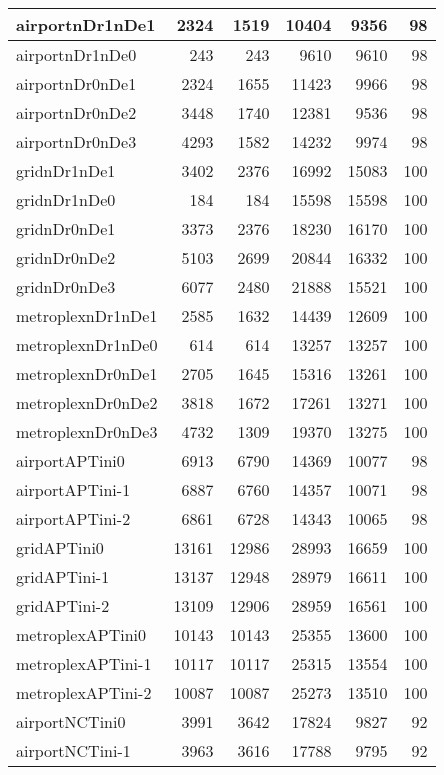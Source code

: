 \begin{longtable}{|l|r|r|r|r|r|}
\endlastfoot
airportnDr1nDe1 & 2324 & 1519 & 10404 & 9356 & 98 \\ \hline
airportnDr1nDe0 & 243 & 243 & 9610 & 9610 & 98 \\ \hline
airportnDr0nDe1 & 2324 & 1655 & 11423 & 9966 & 98 \\ \hline
airportnDr0nDe2 & 3448 & 1740 & 12381 & 9536 & 98 \\ \hline
airportnDr0nDe3 & 4293 & 1582 & 14232 & 9974 & 98 \\ \hline
gridnDr1nDe1 & 3402 & 2376 & 16992 & 15083 & 100 \\ \hline
gridnDr1nDe0 & 184 & 184 & 15598 & 15598 & 100 \\ \hline
gridnDr0nDe1 & 3373 & 2376 & 18230 & 16170 & 100 \\ \hline
gridnDr0nDe2 & 5103 & 2699 & 20844 & 16332 & 100 \\ \hline
gridnDr0nDe3 & 6077 & 2480 & 21888 & 15521 & 100 \\ \hline
metroplexnDr1nDe1 & 2585 & 1632 & 14439 & 12609 & 100 \\ \hline
metroplexnDr1nDe0 & 614 & 614 & 13257 & 13257 & 100 \\ \hline
metroplexnDr0nDe1 & 2705 & 1645 & 15316 & 13261 & 100 \\ \hline
metroplexnDr0nDe2 & 3818 & 1672 & 17261 & 13271 & 100 \\ \hline
metroplexnDr0nDe3 & 4732 & 1309 & 19370 & 13275 & 100 \\ \hline
airportAPTini0 & 6913 & 6790 & 14369 & 10077 & 98 \\ \hline
airportAPTini-1 & 6887 & 6760 & 14357 & 10071 & 98 \\ \hline
airportAPTini-2 & 6861 & 6728 & 14343 & 10065 & 98 \\ \hline
gridAPTini0 & 13161 & 12986 & 28993 & 16659 & 100 \\ \hline
gridAPTini-1 & 13137 & 12948 & 28979 & 16611 & 100 \\ \hline
gridAPTini-2 & 13109 & 12906 & 28959 & 16561 & 100 \\ \hline
metroplexAPTini0 & 10143 & 10143 & 25355 & 13600 & 100 \\ \hline
metroplexAPTini-1 & 10117 & 10117 & 25315 & 13554 & 100 \\ \hline
metroplexAPTini-2 & 10087 & 10087 & 25273 & 13510 & 100 \\ \hline
airportNCTini0 & 3991 & 3642 & 17824 & 9827 & 92 \\ \hline
airportNCTini-1 & 3963 & 3616 & 17788 & 9795 & 92 \\ \hline

\end{longtable}
